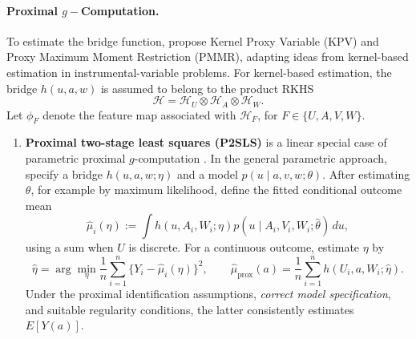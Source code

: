 \documentclass[11pt,twoside]{article}
\begin{document}
\paragraph{Proximal $g-$Computation.}
To estimate the bridge function, \cite{mastouri2021proximal}
propose Kernel Proxy Variable (KPV) and Proxy Maximum Moment
Restriction (PMMR), adapting ideas from kernel-based estimation
in instrumental-variable problems. For kernel-based estimation,
the bridge $h(u,a,w)$ is assumed to belong to the product RKHS
\[
    \mathcal H
    =\mathcal H_U\otimes\mathcal H_A\otimes\mathcal H_W.
\]
Let $\phi_F$ denote the feature map associated with
$\mathcal H_F$, for $F\in\{U,A,V,W\}$.

\begin{enumerate}
    \item \textbf{Proximal two-stage least squares (P2SLS)} is a linear special case of parametric proximal $g$-computation \cite[Section~5]{tchetgen2020introduction}. In the general parametric approach, specify a bridge $h(u,a,w;\eta)$ and a model $p(u\mid a,v,w;\theta)$. After estimating $\theta$, for example by maximum likelihood, define the fitted conditional outcome mean
    \[
    \widehat\mu_i(\eta)
    :=\int h(u,A_i,W_i;\eta)
        p(u\mid A_i,V_i,W_i;\widehat\theta)\,du,
    \]
    using a sum when $U$ is discrete. For a continuous outcome, estimate $\eta$ by
    \begin{equation}
    \label{eq:parametric-prox-ls}
    \widehat\eta
    =\arg\min_\eta\frac1n\sum_{i=1}^n
       \{Y_i-\widehat\mu_i(\eta)\}^2,
    \qquad
    \widehat\mu_{\mathrm{prox}}(a)
    =\frac1n\sum_{i=1}^n h(U_i,a,W_i;\widehat\eta).
    \end{equation}
    Under the proximal identification assumptions, \emph{correct model specification}, and suitable regularity conditions, the latter consistently estimates $E[Y(a)]$.


\end{enumerate}
\end{document}
